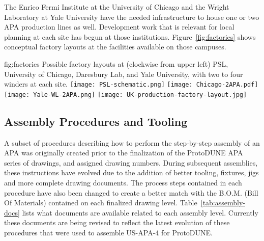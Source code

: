 The Enrico Fermi Institute at the University of Chicago and the Wright Laboratory at Yale University have the needed infrastructure to house one or two APA production lines as well. Development work that is relevant for local planning at each site has begun at those institutions.  Figure~\ref{fig:factories} shows conceptual factory layouts at the facilities available on those campuses.

\begin{dunefigure}{fig:factories}
{Possible factory layouts at (clockwise from upper left) PSL, University of Chicago, Daresbury Lab, and Yale University, with two to four winders at each site.}
\texttt{[image: PSL-schematic.png]} 
\texttt{[image: Chicago-2APA.pdf]}
\texttt{[image: Yale-WL-2APA.png]}
\texttt{[image: UK-production-factory-layout.jpg]} 
\end{dunefigure}


\subsection{Assembly Procedures and Tooling}
\label{sec:fdsp-apa-assy}

A subset of procedures describing how to perform the step-by-step assembly of an APA was originally created prior to the finalization of the ProtoDUNE APA series of drawings, and assigned drawing numbers. During subsequent assemblies, these instructions have evolved due to the addition of better tooling, fixtures, jigs and more complete drawing documents.  The process steps contained in each procedure have also been changed to create a better match with the B.O.M. (Bill Of Materials) contained on each finalized drawing level.  Table~\ref{tab:assembly-docs} lists what documents are available related to each assembly level.  Currently these documents are being revised to reflect the latest evolution of these procedures that were used to assemble US-APA-4 for ProtoDUNE.

